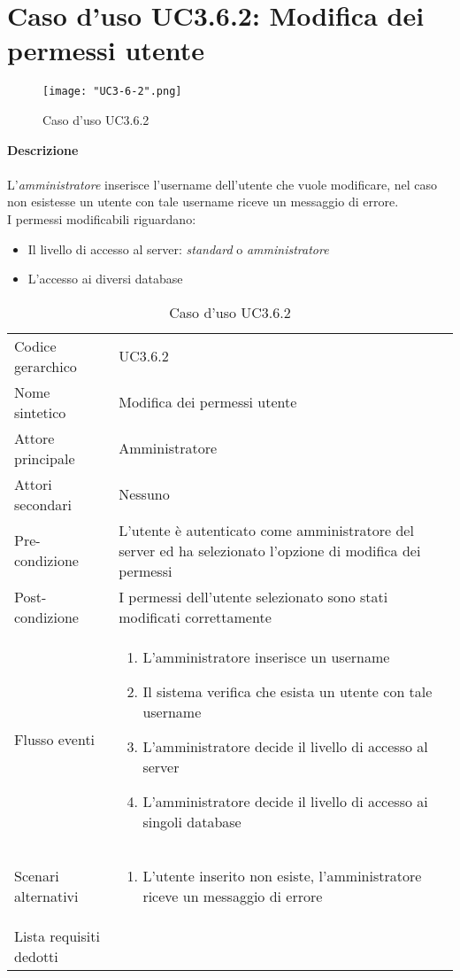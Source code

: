 \documentclass[a4paper]{report}
\begin{document}
	 \section{Caso d'uso UC3.6.2: Modifica dei permessi utente}
	 \begin{figure}[H]
			\centering
			\texttt{[image: "UC3-6-2".png]}
			\caption{Caso d'uso UC3.6.2}
		\end{figure}
	 \textbf{Descrizione} \\ \\
	 L'\emph{amministratore} inserisce l'username dell'utente che vuole modificare, nel caso non esistesse
	  un utente con tale username riceve un messaggio di errore. \\
	 I permessi modificabili riguardano:
	 \begin{itemize}
	 	\item Il livello di accesso al server: \emph{standard} o \emph{amministratore}
	 	\item L'accesso ai diversi database
	 \end{itemize}
		\begin{table}[H]
		\begin{tabularx}{\textwidth}{X | X}\toprule
			\rowcolor{orange!65}Codice gerarchico & UC3.6.2 \\
			Nome sintetico & Modifica dei permessi utente \\
			\rowcolor{orange!65}Attore principale & Amministratore\\
			Attori secondari & Nessuno \\
			\rowcolor{orange!65}Pre-condizione & L'utente è autenticato come amministratore del server ed
			 ha selezionato l'opzione di modifica dei permessi\\
			Post-condizione & I permessi dell'utente selezionato sono stati modificati correttamente \\
			\rowcolor{orange!65}Flusso eventi & \begin{enumerate}
			\item L'amministratore inserisce un username
			\item Il sistema verifica che esista un utente con tale username
			\item L'amministratore decide il livello di accesso al server
			\item L'amministratore decide il livello di accesso ai singoli database
			\end{enumerate} \\
			Scenari alternativi & \begin{enumerate}
			\item L'utente inserito non esiste, l'amministratore riceve un messaggio di errore
			\end{enumerate} \\
			\rowcolor{orange!65}Lista requisiti dedotti & \\
			\bottomrule
		\end{tabularx}
		\caption{Caso d'uso UC3.6.2}
	 \end{table}
\end{document}
